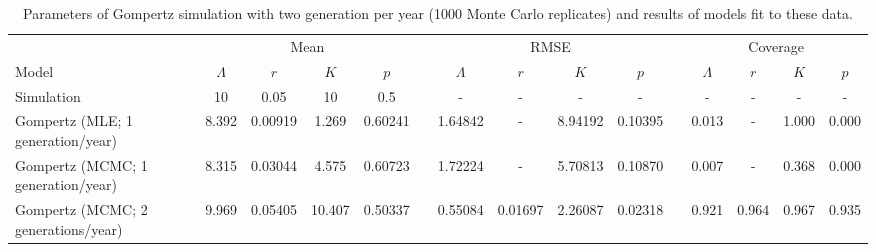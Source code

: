 \documentclass{article}
\begin{document}
\begin{table}
  \centering
  \footnotesize
  \caption{Parameters of Gompertz simulation with two generation per year 
(1000 Monte Carlo replicates)
  and results of models fit to these data.}
  \begin{tabular}{lcccccccccccccc}
    \hline
    & \multicolumn{4}{c}{Mean} &&
    \multicolumn{4}{c}{RMSE} &&
    \multicolumn{4}{c}{Coverage} \\
    \cline{2-5}     \cline{7-10}    \cline{12-15}
    Model & $\Lambda$ & $r$ & $K$ & $p$ &&
    $\Lambda$ & $r$ & $K$ & $p$ && 
    $\Lambda$ & $r$ & $K$ & $p$ \\
    \hline
Simulation & 
10	&0.05	&10	&0.5	&&-	&-	&-	&-	&&-	&-	&-	&-\\
Gompertz (MLE; 1 generation/year) &
8.392	&0.00919	&1.269	&0.60241	&&
1.64842	&-	&8.94192	&0.10395	&&
0.013	&-	&1.000 	&0.000 \\
Gompertz (MCMC; 1 generation/year) &
8.315	&0.03044	&4.575	&0.60723	&&
1.72224	&-	&5.70813	&0.10870	&&
0.007	&-	&0.368		&0.000 \\
Gompertz (MCMC; 2 generations/year) &
9.969	&0.05405	&10.407	&0.50337	&&
0.55084	&0.01697	&2.26087	&0.02318	&&
0.921	&0.964	&0.967	&0.935 \\
  \hline
  \end{tabular}
  \label{tab:simgomp}
\end{table}

\clearpage
\end{document}
